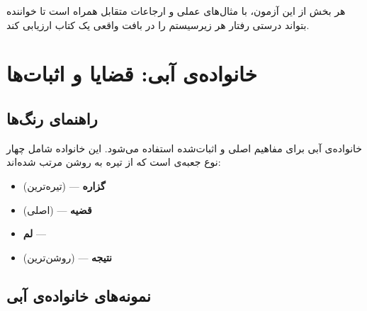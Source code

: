 \documentclass{matinbook}
\begin{document}
هر بخش از این آزمون، با مثال‌های عملی و ارجاعات متقابل
همراه است تا خواننده بتواند درستی رفتار هر زیرسیستم را
در بافت واقعی یک کتاب ارزیابی کند.

\clearpage

\tableofcontents
\clearpage

\listoffigures
\clearpage

\listoftables
\clearpage

\mainmatter
\mainmattergeometry

\chapter{خانواده‌ی آبی: قضایا و اثبات‌ها}
\label{chap:family-blue}

\section{راهنمای رنگ‌ها}
\label{sec:family-blue-guide}

خانواده‌ی آبی برای مفاهیم اصلی و اثبات‌شده استفاده می‌شود.
این خانواده شامل چهار نوع جعبه‌ی  است که
از تیره به روشن مرتب شده‌اند:

\begin{itemize}
    \item \textcolor{matindarkblue}{\textbf{گزاره}} —
     (تیره‌ترین)
    \item \textcolor{matinblue}{\textbf{قضیه}} —
     (اصلی)
    \item \textcolor{matinblue!85!black}{\textbf{لم}} —
    \item \textcolor{matinblue!70!black}{\textbf{نتیجه}} —
     (روشن‌ترین)
\end{itemize}


\section{نمونه‌های خانواده‌ی آبی}
\label{sec:family-blue-samples}
\end{document}

